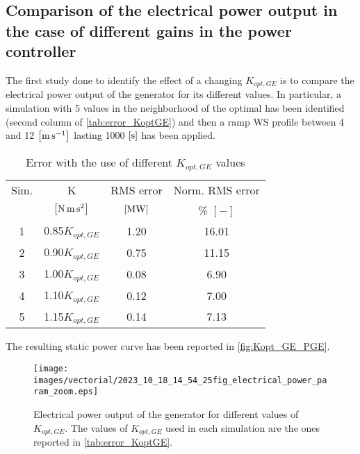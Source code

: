 \subsection{Comparison of the electrical power output in the case of different gains in the power controller}\label{subsec:c_different_KoptGE}
The first study done to identify the effect of a changing $K_{opt,GE}$ is to compare the electrical power output of the generator for its  different values. In particular, a simulation with 5 values in the neighborhood of the optimal has been identified (second column of \autoref{tab:error_KoptGE}) and then a ramp WS profile between 4 and 12 $\left[\si{\meter\per\second}\right]$ lasting 1000 $\left[\si{\second}\right]$ has been applied.
\begin{table}[htb]
  \caption{Error with the use of different $K_{opt,GE}$ values}
  \centering
  \begin{tabular}{cc|cc}
  \toprule
  Sim. & K & RMS error & Norm. RMS error\\ 
   &  $\left[\si{\newton \meter \square \second}\right]$ & $\left[\si{\mega\watt}\right]$ & \% $\left[-\right]$ \\ \midrule
  1 & 0.85$K_{opt,GE}$  & 1.20 & 16.01\\
  2 & 0.90$K_{opt,GE}$  & 0.75 & 11.15\\
  3 & 1.00$K_{opt,GE}$  & 0.08 & 6.90\\
  4 & 1.10$K_{opt,GE}$  & 0.12 & 7.00\\
  5 & 1.15$K_{opt,GE}$  & 0.14 & 7.13\\ \bottomrule
  \end{tabular}
  \label{tab:error_KoptGE}
\end{table}

The resulting static power curve has been reported in \autoref{fig:Kopt_GE_PGE}.
\begin{figure}
  \centering
  \texttt{[image: images/vectorial/2023\_10\_18\_14\_54\_25fig\_electrical\_power\_param\_zoom.eps]}
  \caption{Electrical power output of the generator for different values of $K_{opt,GE}$. The values of $K_{opt,GE}$ used in each simulation are the ones reported in \autoref{tab:error_KoptGE}.}
  \label{fig:Kopt_GE_PGE}
\end{figure}

